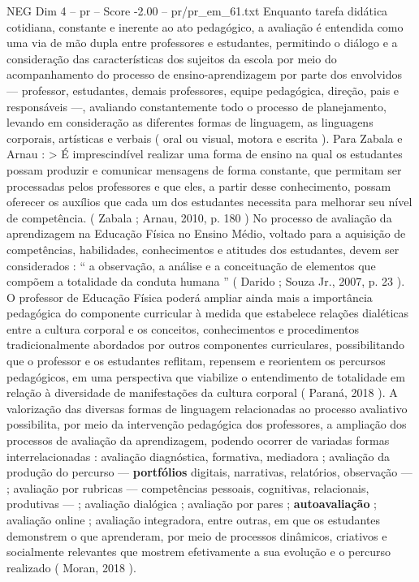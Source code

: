 \begin{textsample}{NEG Dim 4 – pr – Score -2.00 – pr/pr\_em\_61.txt}
Enquanto tarefa didática cotidiana, constante e inerente ao ato pedagógico, a avaliação é entendida como uma via de mão dupla entre professores e estudantes, permitindo o diálogo e a consideração das características dos sujeitos da escola por meio do acompanhamento do processo de ensino-aprendizagem por parte dos envolvidos — professor, estudantes, demais professores, equipe pedagógica, direção, pais e responsáveis —, avaliando constantemente todo o processo de planejamento, levando em consideração as diferentes formas de linguagem, as linguagens corporais, artísticas e verbais ( oral ou visual, motora e escrita ).
Para Zabala e Arnau : > É imprescindível realizar uma forma de ensino na qual os estudantes possam produzir e comunicar mensagens de forma constante, que permitam ser processadas pelos professores e que eles, a partir desse conhecimento, possam oferecer os auxílios que cada um dos estudantes necessita para melhorar seu nível de competência. ( Zabala ; Arnau, 2010, p. 180 ) No processo de avaliação da aprendizagem na Educação Física no Ensino Médio, voltado para a aquisição de competências, habilidades, conhecimentos e atitudes dos estudantes, devem ser considerados : “ a observação, a análise e a conceituação de elementos que compõem a totalidade da conduta humana ” ( Darido ; Souza Jr., 2007, p. 23 ).
O professor de Educação Física poderá ampliar ainda mais a importância pedagógica do componente curricular à medida que estabelece relações dialéticas entre a cultura corporal e os conceitos, conhecimentos e procedimentos tradicionalmente abordados por outros componentes curriculares, possibilitando que o professor e os estudantes reflitam, repensem e reorientem os percursos pedagógicos, em uma perspectiva que viabilize o entendimento de totalidade em relação à diversidade de manifestações da cultura corporal ( Paraná, 2018 ).
A valorização das diversas formas de linguagem relacionadas ao processo avaliativo possibilita, por meio da intervenção pedagógica dos professores, a ampliação dos processos de avaliação da aprendizagem, podendo ocorrer de variadas formas interrelacionadas : avaliação diagnóstica, formativa, mediadora ; avaliação da produção do percurso — \textbf{portfólios} digitais, narrativas, relatórios, observação — ; avaliação por rubricas — competências pessoais, cognitivas, relacionais, produtivas — ; avaliação dialógica ; avaliação por pares ; \textbf{autoavaliação} ; avaliação online ; avaliação integradora, entre outras, em que os estudantes demonstrem o que aprenderam, por meio de processos dinâmicos, criativos e socialmente relevantes que mostrem efetivamente a sua evolução e o percurso realizado ( Moran, 2018 ).

\end{textsample}
